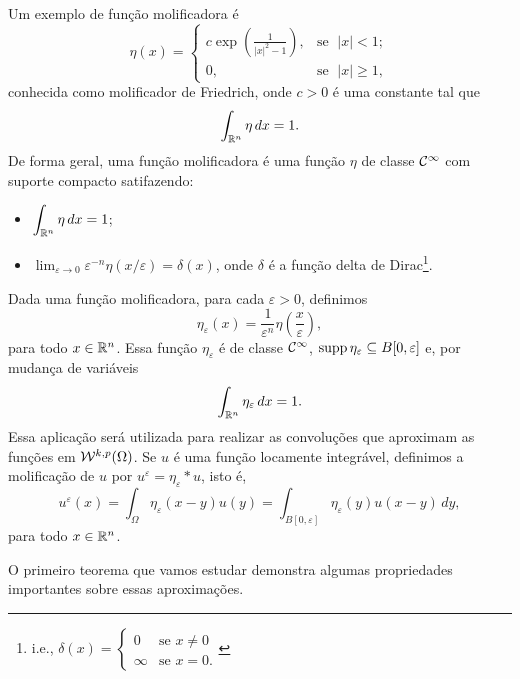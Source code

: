 Um exemplo de função molificadora é
\begin{equation} \label{eq:molificador-friedrich}
    \eta(x) =
    \left\{
        \begin{array}{lr}
            c \exp \left( \frac{1}{|x|^2 - 1} \right), &\! \text{se }\; |x| < 1;\\
            0, &\!\text{se }\; |x| \geqslant 1,
        \end{array}
    \right.
\end{equation}
conhecida como molificador de Friedrich, onde $c > 0$ é uma constante tal que
\[
    \int_{\mathbb{R}^n} \eta \,dx = 1.
\]
De forma geral, uma função molificadora é uma função $\eta$ de classe $\mathcal{C}^\infty$ com suporte compacto satifazendo:
\begin{itemize}[leftmargin=*, label=\small{$\bullet$}]
    \item $\displaystyle \int_{\mathbb{R}^n} \eta \,dx = 1$;
    \item $\displaystyle \lim_{\varepsilon \to 0} \varepsilon^{-n}\eta(x/\varepsilon) = \delta(x)$, onde $\delta$ é a função delta de Dirac\footnote{i.e., $\delta(x) = 
    \left\{  
        \begin{array}{ll}
            0 &\text{se } x \neq 0\\
            \infty &\text{se } x = 0.
        \end{array}
    \right.
    $}.
\end{itemize}
Dada uma função molificadora, para cada $\varepsilon > 0$, definimos
\begin{equation} \label{eq:eta-epsilon}
    \eta_\varepsilon(x) = \frac{1}{\varepsilon^n} \eta\left( \frac{x}{\varepsilon} \right), 
\end{equation}
para todo $x \in \mathbb{R}^n$. Essa função $\eta_\varepsilon$ é de classe $\mathcal{C}^\infty$, $\mathrm{supp}\, \eta_\varepsilon \subseteq B[0,\varepsilon]$ e, por mudança de variáveis
\begin{equation} \label{eq:integral1}
    \int_{\mathbb{R}^n} \eta_\varepsilon \,dx = 1.
\end{equation}
Essa aplicação será utilizada para realizar as convoluções que aproximam as funções em $\mathcal{W}^{k,p}(\Omega)$. Se $u$ é uma função locamente integrável, definimos a molificação de $u$ por $u^\varepsilon = \eta_\varepsilon * u$, isto é,
\[
    u^\varepsilon(x) = \int_\Omega \eta_\varepsilon(x-y) u(y) = \int_{B[0,\varepsilon]} \eta_\varepsilon(y) u(x-y) \,dy,
\]
para todo $x \in \mathbb{R}^n$.

O primeiro teorema que vamos estudar demonstra algumas propriedades importantes sobre essas aproximações.

